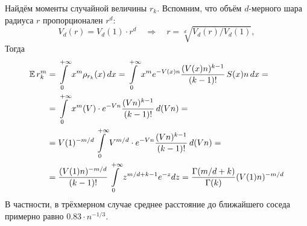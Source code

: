Найдём моменты случайной величины $ r_k $.
Вспомним, что объём $ d $-мерного шара радиуса $ r $ пропорционален $ r^d $:
\[
    V_d(r) = V_d(1) \cdot r^d \quad \Longrightarrow \quad r = \sqrt[d]{V_d(r) / V_d(1)},
\]
Тогда
%
\begin{align}
    \label{eq:low_concentration:kNN_distance_expectation}
    \operatorname{\mathbb{E}} r_k^m &= \int\limits_0^{+\infty} x^m \rho_{r_k}(x) \, dx =
    \int\limits_0^{+\infty} x^m e^{-V(x) n} \frac{(V(x) n)^{k-1}}{(k-1)!} \, S(x) n \, dx = \\
    &= \int\limits_0^{+\infty} x^m(V) \cdot e^{-V n} \frac{(V n)^{k-1}}{(k-1)!} \, d(V n) = \\
    &= V(1)^{-m/d} \int\limits_0^{+\infty} V^{m/d} \cdot e^{-V n} \frac{(V n)^{k-1}}{(k-1)!} \, d(V n) = \\
    &= \frac{(V(1) n)^{-m/d}}{(k-1)!} \int\limits_0^{+\infty} z^{m/d + k - 1} e^{-z} dz
    = \frac{\Gamma(m/d + k)}{\Gamma(k)} (V(1) n)^{-m/d}
\end{align}
В частности, в трёхмерном случае среднее расстояние до ближайшего соседа примерно равно $ 0.83 \cdot n^{-1/3} $.

